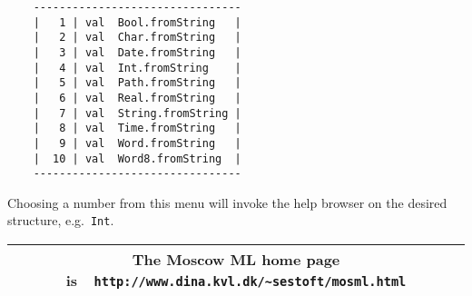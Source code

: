 \documentclass[fleqn,twoside]{article}
\begin{document}
{\small\begin{verbatim}
    --------------------------------
    |   1 | val  Bool.fromString   |
    |   2 | val  Char.fromString   |
    |   3 | val  Date.fromString   |
    |   4 | val  Int.fromString    |
    |   5 | val  Path.fromString   |
    |   6 | val  Real.fromString   |
    |   7 | val  String.fromString |
    |   8 | val  Time.fromString   |
    |   9 | val  Word.fromString   |
    |  10 | val  Word8.fromString  |
    --------------------------------
\end{verbatim}}

\noindent Choosing a number from this menu will invoke the help
browser on the desired structure, e.g.\ {\tt Int}.  

\vfill

\begin{center}
\begin{tabular}{|c|}\hline
\rule[-0.4cm]{0cm}{1cm}The Moscow ML home page is\ \
    \verb$http://www.dina.kvl.dk/~sestoft/mosml.html$\\\hline
\end{tabular}
\end{center}

\newpage

\twocolumn
{\setlength{\parindent}{0cm}
\renewcommand{\contentsline}[3]{#2\hfill #3\hspace*{3em}\newline}
\tableofcontents
}
\onecolumn

\newpage 



\newpage
{}

\end{document}
